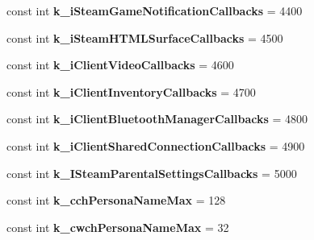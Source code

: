 \begin{DoxyCompactItemize}
const int {\bfseries k\+\_\+i\+Steam\+Game\+Notification\+Callbacks} = 4400
\item 
\mbox{\label{class_valve_1_1_steamworks_1_1_steam_a_p_i_a4158473f396d9854a9fa1896afea1c09}} 
const int {\bfseries k\+\_\+i\+Steam\+H\+T\+M\+L\+Surface\+Callbacks} = 4500
\item 
\mbox{\label{class_valve_1_1_steamworks_1_1_steam_a_p_i_a88189ce3f594e452e5aa1bead48b436f}} 
const int {\bfseries k\+\_\+i\+Client\+Video\+Callbacks} = 4600
\item 
\mbox{\label{class_valve_1_1_steamworks_1_1_steam_a_p_i_a709d9244608d493c837f99deffa8c5fd}} 
const int {\bfseries k\+\_\+i\+Client\+Inventory\+Callbacks} = 4700
\item 
\mbox{\label{class_valve_1_1_steamworks_1_1_steam_a_p_i_a31027597693735f99c8b6e7fed890bcf}} 
const int {\bfseries k\+\_\+i\+Client\+Bluetooth\+Manager\+Callbacks} = 4800
\item 
\mbox{\label{class_valve_1_1_steamworks_1_1_steam_a_p_i_aece2ce0450e40e04686b922bcfeb07ee}} 
const int {\bfseries k\+\_\+i\+Client\+Shared\+Connection\+Callbacks} = 4900
\item 
\mbox{\label{class_valve_1_1_steamworks_1_1_steam_a_p_i_a24c293663fa1a98228e61cd87ba8f961}} 
const int {\bfseries k\+\_\+\+I\+Steam\+Parental\+Settings\+Callbacks} = 5000
\item 
\mbox{\label{class_valve_1_1_steamworks_1_1_steam_a_p_i_a3f8dd6b5803379e3731cd4a8f6c1ead4}} 
const int {\bfseries k\+\_\+cch\+Persona\+Name\+Max} = 128
\item 
\mbox{\label{class_valve_1_1_steamworks_1_1_steam_a_p_i_a82c8a9be2fe701086e855e3924a25825}} 
const int {\bfseries k\+\_\+cwch\+Persona\+Name\+Max} = 32
\item 
\mbox{\label{class_valve_1_1_steamworks_1_1_steam_a_p_i_a169ed479ec1926b75c801212b5be6583}} 

\end{DoxyCompactItemize}
